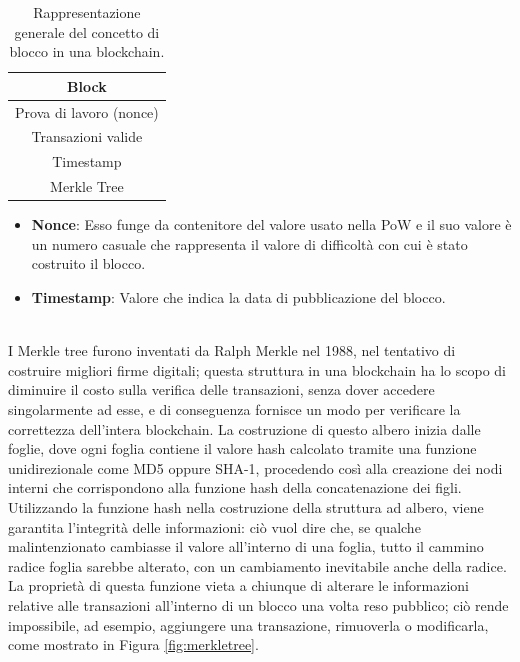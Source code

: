 \begin{table}[ht]
       \centering\small
           \begin{tabular}{|c|}
               \hline
               \textbf{Block}\\
               \hline \hline
               Prova di lavoro (nonce)   \\
               \hline
               Transazioni valide \\
               \hline
               Timestamp \\
               \hline
               Merkle Tree \\
               \hline
       \end{tabular}
       \caption{Rappresentazione generale del concetto di blocco in una blockchain.\label{tab:bitcoinblock}}
   \end{table}



\begin{itemize}
  \item {\bf Nonce\/}: Esso funge da contenitore del valore usato nella PoW e il suo valore è un numero casuale che rappresenta il valore di difficoltà con cui è stato costruito il blocco.
  \item {\bf Timestamp\/}: Valore che indica la data di pubblicazione del blocco.
\end{itemize}
\leavevmode
\\
I Merkle tree furono inventati da Ralph Merkle nel 1988, nel tentativo di costruire migliori firme digitali; questa struttura in una blockchain ha lo scopo di diminuire il costo sulla verifica delle transazioni, senza dover accedere singolarmente ad esse, e di conseguenza fornisce un modo per verificare la correttezza dell’intera blockchain.
La costruzione di questo albero inizia dalle foglie, dove ogni foglia contiene il valore hash calcolato tramite una funzione unidirezionale come MD5 oppure SHA-1, procedendo così alla creazione dei nodi interni che corrispondono alla funzione hash della concatenazione dei figli.
Utilizzando la funzione hash nella costruzione della struttura ad albero, viene garantita l’integrità delle informazioni: ciò vuol dire che, se qualche malintenzionato cambiasse il valore all’interno di una foglia, tutto il cammino radice foglia sarebbe alterato, con un cambiamento inevitabile anche della radice.
La proprietà di questa funzione vieta a chiunque di alterare le informazioni relative alle transazioni all’interno di un blocco una volta reso pubblico; ciò rende impossibile, ad esempio, aggiungere una transazione, rimuoverla o modificarla, come mostrato in Figura \ref{fig:merkletree}.

